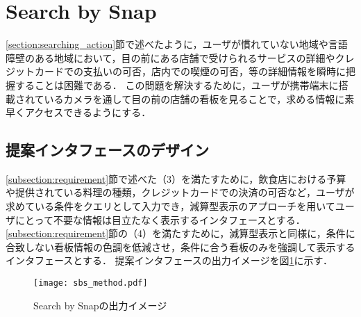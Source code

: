 \section{Search by Snap}
\label{section:design_sbs}
  \ref{section:searching_action}節で述べたように，ユーザが慣れていない地域や言語障壁のある地域において，目の前にある店舗で受けられるサービスの詳細やクレジットカードでの支払いの可否，店内での喫煙の可否，等の詳細情報を瞬時に把握することは困難である．
  この問題を解決するために，ユーザが携帯端末に搭載されているカメラを通して目の前の店舗の看板を見ることで，求める情報に素早くアクセスできるようにする．
  
  \subsection{提案インタフェースのデザイン}
    \ref{subsection:requirement}節で述べた（3）を満たすために，飲食店における予算や提供されている料理の種類，クレジットカードでの決済の可否など，ユーザが求めている条件をクエリとして入力でき，減算型表示のアプローチを用いてユーザにとって不要な情報は目立たなく表示するインタフェースとする．
    \ref{subsection:requirement}節の（4）を満たすために，減算型表示と同様に，条件に合致しない看板情報の色調を低減させ，条件に合う看板のみを強調して表示するインタフェースとする．
    提案インタフェースの出力イメージを図\ref{figure:sbs_method}に示す．
  \begin{figure}[tb]
    \centerline{\texttt{[image: sbs\_method.pdf]}}
    \caption{Search by Snapの出力イメージ}
    \label{figure:sbs_method}
  \end{figure}